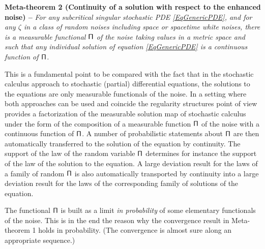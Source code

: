 \documentclass[10pt, reqno]{amsart}
\numberwithin{subsection}{section}
\numberwithin{subsubsection}{subsection}
\numberwithin{equation}{section} %
\theoremstyle{mystyle}
\theoremstyle{mystyle2}
\theoremstyle{mystyle3}
\newcommand{\ssk}{\smallskip}
\begin{document}
\ssk%

\noindent \textbf{\textsf{Meta-theorem 2 (Continuity of a solution with respect to the enhanced noise) --}} \emph{For any subcritical singular stochastic PDE \eqref{EqGenericPDE}, and for any $\zeta$ in a class of random noises including space or spacetime white noises, there is a measurable functional $\sf \Pi$ of the noise taking values in a metric space and such that any individual solution of equation \eqref{EqGenericPDE} is a continuous function of $\sf \Pi$.   }

\ssk%

This is a fundamental point to be compared with the fact that in the stochastic calculus approach to stochastic (partial) differential equations, the solutions to the equations are only measurable functionals of the noise. In a setting where both approaches can be used and coincide the regularity structures point of view provides a factorization of the measurable solution map of stochastic calculus under the form of the composition of a measurable function $\sf \Pi$ of the noise with a continuous function of $\sf \Pi$. A number of probabilistic statements about $\sf \Pi$ are then automatically transferred to the solution of the equation by continuity. The support of the law of the random variable $\sf \Pi$ determines for instance the support of the law of the solution to the equation. A large deviation result for the laws of a family of random $\sf \Pi$ is also automatically transported by continuity into a large deviation result for the laws of the corresponding family of solutions of the equation. 

The functional $\sf \Pi$ is built as a limit {\it in probability} of some elementary functionals of the noise. This is in the end the reason why the convergence result in Meta-theorem 1 holds in probability. (The convergence is almost sure along an appropriate sequence.)

\ssk
\end{document}

